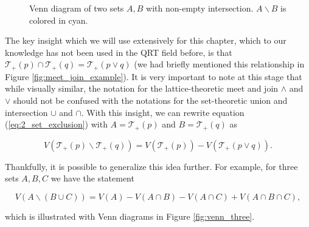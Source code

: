 \begin{figure}[h!] %
    \centering
    \caption{Venn diagram of two sets $A, B$ with non-empty intersection. $A \backslash B$ is colored in cyan.}
    \label{fig:venn_two}
\end{figure}

The key insight which we will use extensively for this chapter, which to our knowledge has not been used in the QRT field before, is that $\mathcal{T}_+(p) \cap \mathcal{T}_+(q) = \mathcal{T}_+(p \vee q)$ (we had briefly mentioned this relationship in Figure \ref{fig:meet_join_example}). It is very important to note at this stage that while visually similar, the notation for the lattice-theoretic meet and join $\wedge$ and $\vee$ should not be confused with the notations for the set-theoretic union and intersection $\cup$ and $\cap$. With this insight, we can rewrite equation (\ref{eq:2_set_exclusion}) with $A = \mathcal{T}_+(p)$ and $B = \mathcal{T}_+(q)$ as

\begin{equation}
    V(\mathcal{T}_+(p) \backslash \mathcal{T}_+(q)) = V(\mathcal{T}_+(p)) - V(\mathcal{T}_+(p \vee q)).
\end{equation}

Thankfully, it is possible to generalize this idea further. For example, for three sets $A, B, C$ we have the statement

\begin{equation}
    V(A \backslash (B \cup C)) = V(A) - V(A \cap B) - V(A \cap C) + V(A \cap B \cap C),
\end{equation}

\noindent which is illustrated with Venn diagrams in Figure \ref{fig:venn_three}.

